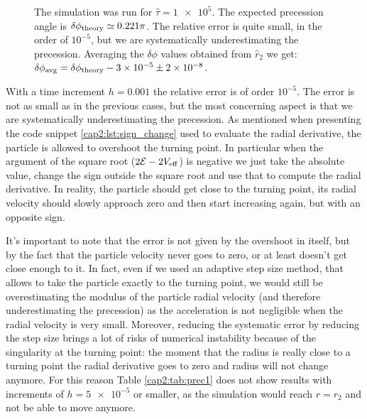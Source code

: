 \begin{figure}[h]
\begin{minipage}{0.48 \textwidth}
        \caption{The simulation was run for $\hat \tau = \num{1e5}$.
        The expected precession angle is $\delta \phi_{\rm theory} \simeq 0.221
        \pi$.
        The relative error is quite small, in the order of $10^{-5}$, but we are
        systematically underestimating the precession.
        Averaging the $\delta \phi$ values obtained from $\hat r_2$ we get: \\
        $\delta \phi_{\rm avg} = \delta \phi_{\rm theory} - \num{3e-5} \pm \num{2e-8}$.}
        \label{cap2:fig:prec2_res}
    \end{minipage}
\end{figure}

With a time increment $h = 0.001$ the relative error is of order $10^{-5}$.
The error is not as small as in the previous cases, but the most concerning
aspect is that we are systematically underestimating the precession.
As mentioned when presenting the code snippet \ref{cap2:lst:sign_change} used to
evaluate the radial derivative, the particle is allowed to overshoot the turning
point.
In particular when the argument of the square root ($2 \mathcal E
- 2 V_{\rm eff}$) is negative we just take the absolute value, change the sign
outside the square root and use that to compute the radial derivative.
In reality, the particle should get close to the turning point, its radial
velocity should slowly approach zero and then start increasing again, but with
an opposite sign.

It's important to note that the error is not given by the overshoot in itself,
but by the fact that the particle velocity never goes to zero, or at least
doesn't get close enough to it.
In fact, even if we used an adaptive step size method, that allows to take the
particle exactly to the turning point, we would still be overestimating the
modulus of the particle radial velocity (and therefore underestimating the
precession) as the acceleration is not negligible when the radial velocity is
very small.
Moreover, reducing the systematic error by reducing the step size brings a lot
of risks of numerical instability because of the singularity at the turning
point: the moment that the radius is really close to a turning point the radial
derivative goes to zero and radius will not change anymore.
For this reason Table \ref{cap2:tab:prec1} does not show results with increments
of $h = \num{5e-5}$ or smaller, as the simulation would reach $r = r_2$ and not
be able to move anymore.

